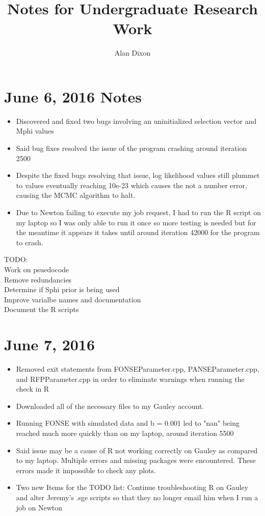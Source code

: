 \documentclass[12pt]{labbook}
\title{Notes for Undergraduate Research Work}
\author{Alan Dixon}
\begin{document}
\section{June 6, 2016 Notes}

\begin{itemize}
    \item Discovered and fixed two bugs involving an uninitialized selection vector and Mphi values
    \item Said bug fixes resolved the issue of the program crashing around iteration 2500
    \item Despite the fixed bugs resolving that issue, log likelihood values still plummet to values eventually reaching 10e-23 which causes the not a number error, causing the MCMC algorithm to halt.
    \item Due to Newton failing to execute my job request, I had to run the R script on my laptop so I was only able to run it once so more testing is needed but for the meantime it appears it takes until around iteration 42000 for the program to crash.
    \end{itemize}

TODO:\\
    Work on psuedocode\\
    Remove redundancies\\
    Determine if Sphi prior is being used\\
    Improve varialbe names and documentation\\
    Document the R scripts\\
    
\section{June 7, 2016}

\begin{itemize}
    \item Removed exit statements from FONSEParameter.cpp, PANSEParameter.cpp, and RFPParameter.cpp in order to eliminate warnings when running the check in R
    \item Downloaded all of the necessary files to my Gauley account.
    \item Running FONSE with simulated data and b = 0.001 led to "nan" being reached much more quickly than on my laptop, around iteration 5500
    \item Said issue may be a cause of R not working correctly on Gauley as compared to my laptop. Multiple errors and missing packages were encountered. These errors made it impossible to check any plots.
    \item Two new Items for the TODO list: Continue troubleshooting R on Gauley and alter Jeremy's .sge scripts so that they no longer email him when I run a job on Newton
\end{itemize}
\end{document}
